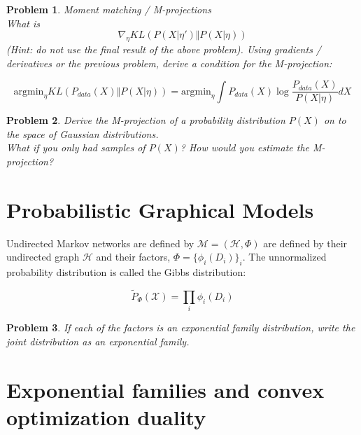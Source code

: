 \documentclass[a4paper]{article}
\newtheorem{problem}{Problem}[section]
\begin{document}
\begin{problem}
Moment matching / M-projections \\
What is 
\begin{equation}
  \nabla_\eta KL\left( P( X \vert \eta') \Vert P( X \vert \eta) \right)
  \label{}
\end{equation}
(Hint: do not use the final result of the above problem).
Using gradients / derivatives or the previous problem, derive a condition for the M-projection:

\begin{equation}
  \text{argmin}_\eta KL \left( P_{data}(X) \Vert P( X \vert \eta) \right) = \text{argmin}_\eta \int P_{data}(X) \log \frac{ P_{data}(X) }{ P( X \vert \eta) } dX
  \label{}
\end{equation}
\end{problem}

\begin{problem}
  Derive the M-projection of a probability distribution $P(X)$ on to the space of Gaussian distributions.  \\
  What if you only had samples of $P(X)$?  How would you estimate the M-projection?
\end{problem}

\section{Probabilistic Graphical Models}

Undirected Markov networks are defined by $\mathcal{M} = \left( \mathcal{H}, \Phi \right) $ are defined by their undirected graph $\mathcal{H}$ and their factors, $\Phi = \{ \phi_i(D_i) \}_i$.  
The unnormalized probability distribution is called the Gibbs distribution:

\begin{equation}
  \tilde{P}_\Phi(\mathcal{X}) = \prod_i \phi_i(D_i)
  \label{Gibbs distribution}
\end{equation}

\begin{problem}
  If each of the factors is an exponential family distribution, write the joint distribution as an exponential family.  \\
\end{problem}

\section{Exponential families and convex optimization duality}
\end{document}
